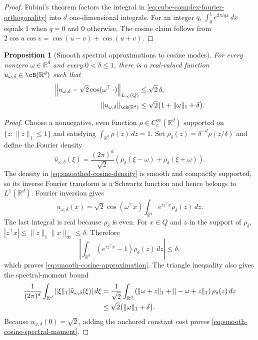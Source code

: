 \documentclass[11pt,twoside]{article}
\newcommand{\R}{\mathbb R}
\newtheorem{proposition}[theorem]{Proposition}
\theoremstyle{definition}
\theoremstyle{remark}
\begin{document}
\begin{proof}
Fubini's theorem factors the integral in
\cref{eq:cube-complex-fourier-orthogonality} into $d$ one-dimensional
integrals. For an integer $q$,
$\int_0^1e^{2\pi iqx}\,dx$ equals $1$ when $q=0$ and $0$ otherwise. The
cosine claim follows from
$2\cos u\cos v=\cos(u-v)+\cos(u+v)$.
\end{proof}

\begin{proposition}[Smooth spectral approximations to cosine modes]
\label{prop:smooth-cosine-spectra}
For every nonzero $\omega\in\R^d$ and every $0<\delta\leq1$, there is a
real-valued function $u_{\omega,\delta}\in\cB(\R^d)$ such that
\begin{align}
 \left\|u_{\omega,\delta}
 -\sqrt2\cos(\omega^\top\,\cdot)\right\|_{L_\infty(Q)}
 &\leq\sqrt2\,\delta,
 \label{eq:smooth-cosine-approximation}\\
 \|u_{\omega,\delta}\|_{\cB(\R^d)}
 &\leq\sqrt2\bigl(1+\|\omega\|_1+\delta\bigr).
 \label{eq:smooth-cosine-spectral-moment}
\end{align}
\end{proposition}

\begin{proof}
Choose a nonnegative, even function $\rho\in C_c^\infty(\R^d)$ supported on
$\{z:\|z\|_1\leq1\}$ and satisfying
$\int_{\R^d}\rho(z)\,dz=1$. Set
$\rho_\delta(z)=\delta^{-d}\rho(z/\delta)$ and define the Fourier density
\begin{equation}
 \widehat u_{\omega,\delta}(\xi)
 =\frac{(2\pi)^d}{\sqrt2}
 \left(\rho_\delta(\xi-\omega)+\rho_\delta(\xi+\omega)\right).
 \label{eq:smoothed-cosine-density}
\end{equation}
The density in \cref{eq:smoothed-cosine-density} is smooth and compactly
supported, so its inverse Fourier transform is a Schwartz function and hence
belongs to \(L^1(\R^d)\). Fourier inversion gives
\begin{equation}
 u_{\omega,\delta}(x)
 =\sqrt2\cos(\omega^\top x)
 \int_{\R^d}e^{iz^\top x}\rho_\delta(z)\,dz.
 \label{eq:smoothed-cosine-function}
\end{equation}
The last integral is real because $\rho_\delta$ is even. For $x\in Q$ and
$z$ in the support of $\rho_\delta$,
$|z^\top x|\leq\|z\|_1\|x\|_\infty\leq\delta$. Therefore
\begin{equation}
 \left|\int_{\R^d}(e^{iz^\top x}-1)\rho_\delta(z)\,dz\right|
 \leq\delta,
 \label{eq:mollified-mode-uniform-bound}
\end{equation}
which proves \cref{eq:smooth-cosine-approximation}. The triangle inequality
also gives the spectral-moment bound
\begin{align}
 \frac1{(2\pi)^d}\int_{\R^d}
 \|\xi\|_1|\widehat u_{\omega,\delta}(\xi)|\,d\xi
 &=\frac{1}{\sqrt2}\int_{\R^d}
 \left(\|\omega+z\|_1+\|-\omega+z\|_1\right)
 \rho_\delta(z)\,dz\notag\\
 &\leq\sqrt2\bigl(\|\omega\|_1+\delta\bigr).
 \label{eq:smoothed-mode-moment-calculation}
\end{align}
Because $u_{\omega,\delta}(0)=\sqrt2$, adding the anchored constant cost
proves \cref{eq:smooth-cosine-spectral-moment}.
\end{proof}
\end{document}
